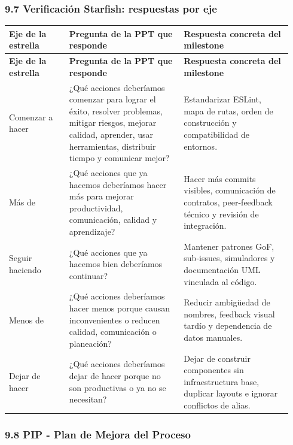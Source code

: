 \documentclass[11pt,a4paper]{article}
\begin{document}
\subsubsection{9.7 Verificación Starfish: respuestas por eje}

\begingroup
\scriptsize
\setlength{\tabcolsep}{3pt}
\begin{longtable}{P{0.20\linewidth}P{0.38\linewidth}P{0.36\linewidth}}
\toprule
\textbf{Eje de la estrella} & \textbf{Pregunta de la PPT que responde} & \textbf{Respuesta concreta del milestone} \\
\midrule
\endfirsthead
\toprule
\textbf{Eje de la estrella} & \textbf{Pregunta de la PPT que responde} & \textbf{Respuesta concreta del milestone} \\
\midrule
\endhead
\bottomrule
\endlastfoot
Comenzar a hacer & ¿Qué acciones deberíamos comenzar para lograr el éxito, resolver problemas, mitigar riesgos, mejorar calidad, aprender, usar herramientas, distribuir tiempo y comunicar mejor? & Estandarizar ESLint, mapa de rutas, orden de construcción y compatibilidad de entornos. \\
Más de & ¿Qué acciones que ya hacemos deberíamos hacer más para mejorar productividad, comunicación, calidad y aprendizaje? & Hacer más commits visibles, comunicación de contratos, peer-feedback técnico y revisión de integración. \\
Seguir haciendo & ¿Qué acciones que ya hacemos bien deberíamos continuar? & Mantener patrones GoF, sub-issues, simuladores y documentación UML vinculada al código. \\
Menos de & ¿Qué acciones deberíamos hacer menos porque causan inconvenientes o reducen calidad, comunicación o planeación? & Reducir ambigüedad de nombres, feedback visual tardío y dependencia de datos manuales. \\
Dejar de hacer & ¿Qué acciones deberíamos dejar de hacer porque no son productivas o ya no se necesitan? & Dejar de construir componentes sin infraestructura base, duplicar layouts e ignorar conflictos de alias. \\
\end{longtable}
\endgroup

\subsubsection{9.8 PIP - Plan de Mejora del Proceso}
\end{document}
